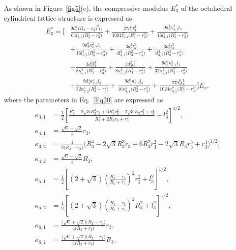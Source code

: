 \documentclass[12pt,a4paper]{article}
\begin{document}
	As shown in Figure~\ref{fig5}(c), the compressive modulus $E_3^*$ of the octahedral cylindrical lattice structure is expressed as
	\begin{equation}
		\begin{aligned}
			E_3^*
			= \Bigg[
			&\frac{9d_3^4\bigl(R_3-r_3\bigr)^2l_3}
			{64l_{3,4}^5\bigl(R_3^2-r_3^2\bigr)}
			+\frac{27d_3^6l_3^3}
			{1024l_{3,4}^7\bigl(R_3^2-r_3^2\bigr)}
			+\frac{9d_3^4\kappa_{4,1}^2l_3}
			{16l_{3,1}^5\bigl(R_3^2-r_3^2\bigr)}
			\\
			&+\frac{9d_3^4\kappa_{4,2}^2l_3}
			{16l_{3,2}^5\bigl(R_3^2-r_3^2\bigr)}
			+\frac{3d_3^2l_3^3}
			{4l_{3,1}^3\bigl(R_3^2-r_3^2\bigr)}
			+\frac{3d_3^2l_3^3}
			{4l_{3,2}^3\bigl(R_3^2-r_3^2\bigr)}
			\\
			&+\frac{3d_3^2l_3^3}
			{8\kappa_{5,1}^3\bigl(R_3^2-r_3^2\bigr)}
			+\frac{3d_3^2l_3^3}
			{8\kappa_{5,2}^3\bigl(R_3^2-r_3^2\bigr)}
			+\frac{9d_3^4\kappa_{6,1}^2l_3}
			{32\kappa_{5,1}^5\bigl(R_3^2-r_3^2\bigr)}
			\\
			&+\frac{9d_3^4\kappa_{6,2}^2l_3}
			{32\kappa_{5,2}^5\bigl(R_3^2-r_3^2\bigr)}
			+\frac{9d_3^4\kappa_{3,2}^2l_3}
			{16\kappa_{3,1}^5\bigl(R_3^2-r_3^2\bigr)}
			+\frac{27d_3^6l_3^3}
			{1024\kappa_{3,1}^7\bigl(R_3^2-r_3^2\bigr)}
			\Bigg]E_s ,
		\end{aligned}
		\label{Eq20}
	\end{equation}
	where the parameters in Eq.~\eqref{Eq20} are expressed as
	\[
	\begin{aligned}
		\kappa_{3,1}
		&=
		\frac{1}{2}
		\left[
		\frac{
			R_3^4
			-2\sqrt{3}R_3^3r_3
			+6R_3^2r_3^2
			-2\sqrt{3}R_3r_3^3
			+r_3^4
		}{
			R_3^2+2R_3r_3+r_3^2
		}
		+l_3^2
		\right]^{1/2}, \\
		\kappa_{4,1}
		&=
		\frac{\sqrt{6}-\sqrt{2}}{4}r_3, \\[0.5em]
		\kappa_{3,2}
		&=
		\frac{1}{2\bigl(R_3+r_3\bigr)}
		\bigl(
		R_3^4
		-2\sqrt{3}R_3^3r_3
		+6R_3^2r_3^2
		-2\sqrt{3}R_3r_3^3
		+r_3^4
		\bigr)^{1/2}, \\
		\kappa_{4,2}
		&=
		\frac{\sqrt{6}-\sqrt{2}}{4}R_3, \\[0.5em]
		\kappa_{5,1}
		&=
		\frac{1}{2}
		\left[
		\left(2+\sqrt{3}\right)
		\left(\frac{R_3-r_3}{R_3+r_3}\right)^2r_3^2
		+l_3^2
		\right]^{1/2}, \\
		\kappa_{5,2}
		&=
		\frac{1}{2}
		\left[
		\left(2+\sqrt{3}\right)
		\left(\frac{R_3-r_3}{R_3+r_3}\right)^2R_3^2
		+l_3^2
		\right]^{1/2}, \\[0.5em]
		\kappa_{6,1}
		&=
		\frac{\bigl(\sqrt{6}+\sqrt{2}\bigr)\bigl(R_3-r_3\bigr)}
		{4\bigl(R_3+r_3\bigr)}r_3, \\
		\kappa_{6,2}
		&=
		\frac{\bigl(\sqrt{6}+\sqrt{2}\bigr)\bigl(R_3-r_3\bigr)}
		{4\bigl(R_3+r_3\bigr)}R_3 .
	\end{aligned}
	\]
	
\end{document}
